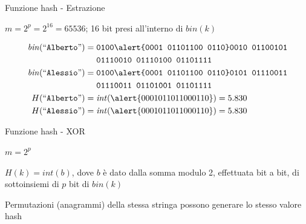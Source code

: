 \begin{frame}{Funzione hash - Estrazione}


\vspace{-9pt}
\begin{myboxtitle}[Esempio 2]
$m = 2^p = 2^{16} = 65536$; 16 bit presi all'interno di $\mathit{bin}(k)$

\begin{align*}
\mathit{bin}(``\texttt{Alberto}") = {} & \texttt{0100\alert{0001  01101100  0110}0010  01100101} \\ 
&  \texttt{01110010  01110100  01101111}\\
\mathit{bin}(``\texttt{Alessio}") = {} & \texttt{0100\alert{0001  01101100  0110}0101  01110011} \\ 
&  \texttt{01110011  01101001  01101111} \\
H(``\texttt{Alberto}") = {} & \mathit{int}(\alert{0001011011000110}) = 5.830 \\
H(``\texttt{Alessio}") = {} & \mathit{int}(\alert{0001011011000110}) = 5.830
\end{align*}
\end{myboxtitle}


\end{frame}

\begin{frame}[shrink=5]{Funzione hash - XOR}

\vspace{-9pt}
\begin{myboxtitle}[XOR]
\BIL
\item $m = 2^p$
\item $H(k) = \mathit{int}(b)$, dove $b$ è dato dalla somma modulo 2, effettuata bit a bit, di sottoinsiemi di $p$ bit di $\mathit{bin}(k)$
\EIL
\end{myboxtitle}

\begin{myboxtitle}[Problemi]
\BIL
\item Permutazioni (anagrammi) della stessa stringa possono generare lo stesso valore hash
\EIL
\end{myboxtitle}


\end{frame}


